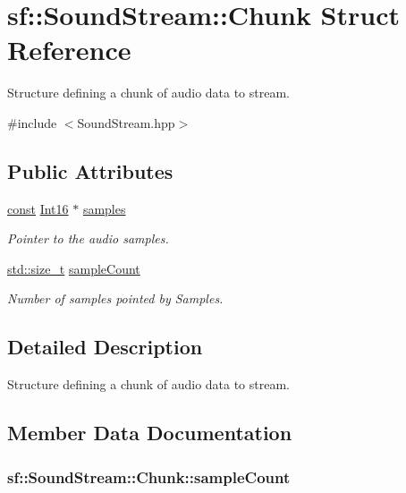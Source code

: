 \hypertarget{structsf_1_1_sound_stream_1_1_chunk}{\section{sf\-:\-:Sound\-Stream\-:\-:Chunk Struct Reference}
\label{structsf_1_1_sound_stream_1_1_chunk}
}


Structure defining a chunk of audio data to stream.  




{\ttfamily \#include $<$Sound\-Stream.\-hpp$>$}

\subsection*{Public Attributes}
\begin{DoxyCompactItemize}
\item 
\hyperlink{term__entry_8h_a57bd63ce7f9a353488880e3de6692d5a}{const} \hyperlink{namespacesf_a3c8e10435e2a310a7741755e66b5c94e}{Int16} $\ast$ \hyperlink{structsf_1_1_sound_stream_1_1_chunk_ae0b301e2bdfc530a6dc9efeac7e8a2e7}{samples}
\begin{DoxyCompactList}\small\item\em Pointer to the audio samples. \end{DoxyCompactList}\item 
\hyperlink{nc__alloc_8h_a7b60c5629e55e8ec87a4547dd4abced4}{std\-::size\-\_\-t} \hyperlink{structsf_1_1_sound_stream_1_1_chunk_af47f5d94012acf8b11f056ba77aff97a}{sample\-Count}
\begin{DoxyCompactList}\small\item\em Number of samples pointed by Samples. \end{DoxyCompactList}\end{DoxyCompactItemize}


\subsection{Detailed Description}
Structure defining a chunk of audio data to stream. 

\subsection{Member Data Documentation}
\hypertarget{structsf_1_1_sound_stream_1_1_chunk_af47f5d94012acf8b11f056ba77aff97a}{
\subsubsection[{sample\-Count}]{ sf\-::\-Sound\-Stream\-::\-Chunk\-::sample\-Count}}\label{structsf_1_1_sound_stream_1_1_chunk_af47f5d94012acf8b11f056ba77aff97a}


